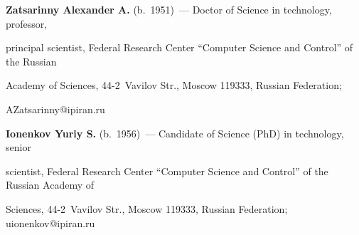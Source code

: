\Contr



\noindent

\textbf{Zatsarinny Alexander A.} (b.\ 1951)~--- Doctor of Science in technology, professor, 

principal scientist, Federal Research Center ``Computer Science and Control'' of the Russian 

Academy of Sciences, 44-2~Vavilov Str., Moscow 119333, Russian Federation; 

\mbox{AZatsarinny@ipiran.ru}



\vspace*{3pt}



\noindent

\textbf{Ionenkov Yuriy S.} (b.\ 1956)~--- Candidate of Science (PhD) in technology, senior 

scientist, Federal Research Center ``Computer Science and Control'' of the Russian Academy of 

Sciences, 44-2~Vavilov Str., Moscow 119333, Russian Federation; \mbox{uionenkov@ipiran.ru}







\label{end\stat}



\renewcommand{\bibname}{\protect\rm Литература} 


